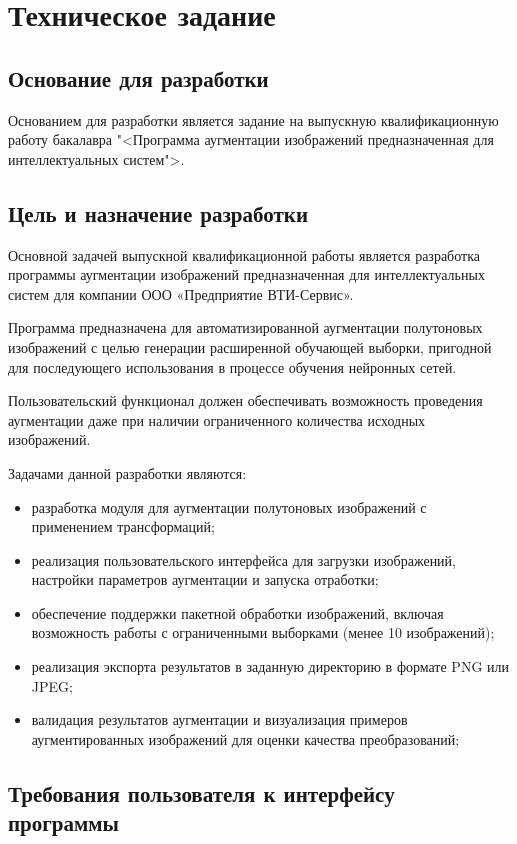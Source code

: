 \section{Техническое задание}
\subsection{Основание для разработки}

Основанием для разработки является задание на выпускную квалификационную работу бакалавра "<Программа аугментации изображений предназначенная для интеллектуальных систем">.

\subsection{Цель и назначение разработки}

Основной задачей выпускной квалификационной работы является разработка программы аугментации изображений предназначенная для интеллектуальных систем для компании ООО «Предприятие ВТИ-Сервис».

Программа предназначена для автоматизированной аугментации полутоновых изображений с целью генерации расширенной обучающей выборки, пригодной для последующего использования в процессе обучения нейронных сетей.

Пользовательский функционал должен обеспечивать возможность проведения аугментации даже при наличии ограниченного количества исходных изображений.

Задачами данной разработки являются:

\begin{itemize}
\item разработка модуля для аугментации полутоновых изображений с применением трансформаций;
\item реализация пользовательского интерфейса для загрузки изображений, настройки параметров аугментации и запуска отработки;
\item обеспечение поддержки пакетной обработки изображений, включая возможность работы с ограниченными выборками (менее 10 изображений);
\item реализация экспорта результатов в заданную директорию в формате PNG или JPEG;
\item валидация результатов аугментации и визуализация примеров аугментированных изображений для оценки качества преобразований;
\end{itemize}

\subsection{Требования пользователя к интерфейсу программы}

